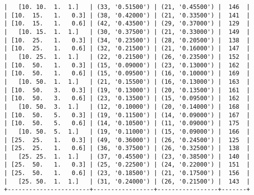 \documentclass{article}
\begin{document}
\begin{verbatim}
|   [10. 10.  1.  1.]   | (33, '0.51500') | (21, '0.45500') |  146  |
| [10.  15.   1.   0.3] | (38, '0.42000') | (21, '0.33500') |  141  |
| [10.  15.   1.   0.6] | (42, '0.43500') | (29, '0.37000') |  129  |
|   [10. 15.  1.  1.]   | (30, '0.37500') | (21, '0.33000') |  149  |
| [10.  25.   1.   0.3] | (34, '0.23500') | (28, '0.20500') |  138  |
| [10.  25.   1.   0.6] | (32, '0.21500') | (21, '0.16000') |  147  |
|   [10. 25.  1.  1.]   | (22, '0.21500') | (26, '0.23500') |  152  |
| [10.  50.   1.   0.3] | (15, '0.09000') | (23, '0.13000') |  162  |
| [10.  50.   1.   0.6] | (15, '0.09500') | (16, '0.10000') |  169  |
|   [10. 50.  1.  1.]   | (21, '0.15500') | (16, '0.13000') |  163  |
| [10.  50.   3.   0.3] | (19, '0.13000') | (20, '0.13500') |  161  |
| [10.  50.   3.   0.6] | (23, '0.13500') | (15, '0.09500') |  162  |
|   [10. 50.  3.  1.]   | (12, '0.10000') | (20, '0.14000') |  168  |
| [10.  50.   5.   0.3] | (19, '0.11500') | (14, '0.09000') |  167  |
| [10.  50.   5.   0.6] | (14, '0.10500') | (11, '0.09000') |  175  |
|   [10. 50.  5.  1.]   | (19, '0.11000') | (15, '0.09000') |  166  |
| [25.  25.   1.   0.3] | (49, '0.36000') | (26, '0.24500') |  125  |
| [25.  25.   1.   0.6] | (36, '0.37500') | (26, '0.32500') |  138  |
|   [25. 25.  1.  1.]   | (37, '0.45500') | (23, '0.38500') |  140  |
| [25.  50.   1.   0.3] | (25, '0.22500') | (24, '0.22000') |  151  |
| [25.  50.   1.   0.6] | (23, '0.18500') | (21, '0.17500') |  156  |
|   [25. 50.  1.  1.]   | (31, '0.24000') | (26, '0.21500') |  143  |
+-----------------------+-----------------+-----------------+-------+
\end{verbatim}
\end{document}
